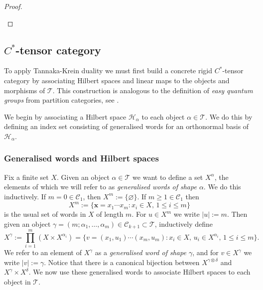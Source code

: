 \documentclass[12pt, a4paper]{amsart}
\def\CC{\mathcal{C}}
\def\HH{\mathcal{H}}
\def\TT{\mathcal{T}}
\theoremstyle{definition}
\theoremstyle{remark}
\numberwithin{equation}{section}
\begin{document}
\begin{proof}
\begin{center}
\end{center}
\end{proof}

\subsection{$C^*$-tensor category}

To apply Tannaka-Krein duality we must first build a concrete rigid $C^*$-tensor category by associating Hilbert spaces and linear maps to the objects and morphisms of $\TT$. This construction is analogous to the definition of \emph{easy quantum groups} from partition categories, see \cite{BS2009}.

We begin by associating a Hilbert space $\HH_\alpha$ to each object $\alpha\in \TT$. We do this by defining an index set consisting of generalised words for an orthonormal basis of $\HH_\alpha$.

\subsubsection{Generalised words and Hilbert spaces}\label{sec:C*tensorcat} Fix a finite set $X$. Given an object $\alpha \in \TT$ we want to define a set $X^\alpha$, the elements of which we will refer to as \emph{generalised words of shape $\alpha$}. We do this inductively. If $m=0\in\CC_1$, then $X^m := \{\varnothing\}$. If $m \geq 1 \in \CC_1$ then
\[
 X^m := \{\mathbf{x} = x_1\cdots x_m : x_i \in X,\, 1\leq i \leq m\}
\]
is the usual set of words in $X$ of length $m$. For $u \in X^m$ we write $|u|:=m$. Then given an object $\gamma = (m;\alpha_1,\dots,\alpha_m) \in \CC_{k+1} \subset \TT$, inductively define
\[
 X^\gamma := \prod_{i=1}^m (X \times X^{\alpha_i}) = \{ v = (x_1,u_1)\cdots(x_m,u_m) : x_i\in X, \,u_i \in X^{\alpha_i}, \,1\leq i \leq m \}.
\]
We refer to an element of $X^\gamma$ as a \emph{generalised word of shape $\gamma$}, and for $v\in X^\gamma$ we write $|v| := \gamma$. Notice that there is a canonical bijection between $X^{\gamma\otimes\delta}$ and $X^\gamma \times X^\delta$. We now use these generalised words to associate Hilbert spaces to each object in $\TT$. 
\end{document}
